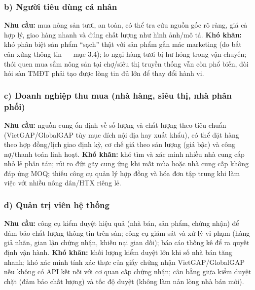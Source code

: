 \subsubsection*{b) Người tiêu dùng cá nhân}
\textbf{Nhu cầu:} mua nông sản tươi, an toàn, có thể tra cứu nguồn gốc rõ ràng, giá cả hợp lý, giao hàng nhanh và đúng chất lượng như hình ảnh/mô tả. \textbf{Khó khăn:} khó phân biệt sản phẩm ``sạch'' thật với sản phẩm gắn mác marketing (do bất cân xứng thông tin --- mục 3.4); lo ngại hàng tươi bị hư hỏng trong vận chuyển; thói quen mua sắm nông sản tại chợ/siêu thị truyền thống vẫn còn phổ biến, đòi hỏi sàn TMĐT phải tạo được lòng tin đủ lớn để thay đổi hành vi.

\subsubsection*{c) Doanh nghiệp thu mua (nhà hàng, siêu thị, nhà phân phối)}
\textbf{Nhu cầu:} nguồn cung ổn định về số lượng và chất lượng theo tiêu chuẩn (VietGAP/GlobalGAP tùy mục đích nội địa hay xuất khẩu), có thể đặt hàng theo hợp đồng/lịch giao định kỳ, cơ chế giá theo sản lượng (giá bậc) và công nợ/thanh toán linh hoạt. \textbf{Khó khăn:} khó tìm và xác minh nhiều nhà cung cấp nhỏ lẻ phân tán; rủi ro đứt gãy cung ứng khi mất mùa hoặc nhà cung cấp không đáp ứng MOQ; thiếu công cụ quản lý hợp đồng và hóa đơn tập trung khi làm việc với nhiều nông dân/HTX riêng lẻ.

\subsubsection*{d) Quản trị viên hệ thống}
\textbf{Nhu cầu:} công cụ kiểm duyệt hiệu quả (nhà bán, sản phẩm, chứng nhận) để đảm bảo chất lượng thông tin trên sàn; công cụ giám sát và xử lý vi phạm (hàng giả nhãn, gian lận chứng nhận, khiếu nại gian dối); báo cáo thống kê để ra quyết định vận hành. \textbf{Khó khăn:} khối lượng kiểm duyệt lớn khi số nhà bán tăng nhanh; khó xác minh tính xác thực của giấy chứng nhận VietGAP/GlobalGAP nếu không có API kết nối với cơ quan cấp chứng nhận; cân bằng giữa kiểm duyệt chặt (đảm bảo chất lượng) và tốc độ duyệt (không làm nản lòng nhà bán mới).